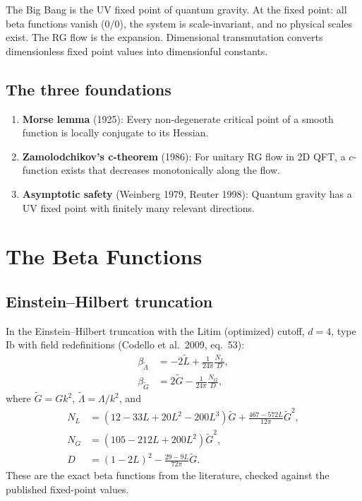 \documentclass[12pt]{article}
\begin{document}
The Big Bang is the UV fixed point of quantum gravity. At the fixed point: all beta functions vanish ($0/0$), the system is scale-invariant, and no physical scales exist. The RG flow is the expansion. Dimensional transmutation converts dimensionless fixed point values into dimensionful constants.

\subsection{The three foundations}

\begin{enumerate}
\item \textbf{Morse lemma} (1925): Every non-degenerate critical point of a smooth function is locally conjugate to its Hessian.
\item \textbf{Zamolodchikov's c-theorem} (1986): For unitary RG flow in 2D QFT, a $c$-function exists that decreases monotonically along the flow.
\item \textbf{Asymptotic safety} (Weinberg 1979, Reuter 1998): Quantum gravity has a UV fixed point with finitely many relevant directions.
\end{enumerate}

\section{The Beta Functions}

\subsection{Einstein--Hilbert truncation}

In the Einstein--Hilbert truncation with the Litim (optimized) cutoff, $d=4$, type Ib with field redefinitions (Codello et al.\ 2009, eq.\ 53):
\begin{align}
\beta_{\tilde\Lambda} &= -2\tilde L + \frac{1}{24\pi}\frac{N_L}{D}, \\
\beta_{\tilde G} &= 2\tilde G - \frac{1}{24\pi}\frac{N_G}{D},
\end{align}
where $\tilde G=Gk^2$, $\tilde\Lambda=\Lambda/k^2$, and
\begin{align}
N_L &= (12-33L+20L^2-200L^3)\tilde G + \frac{467-572L}{12\pi}\tilde G^2, \\
N_G &= (105-212L+200L^2)\tilde G^2, \\
D &= (1-2L)^2 - \frac{29-9L}{72\pi}\tilde G.
\end{align}
These are the exact beta functions from the literature, checked against the published fixed-point values.
\end{document}
